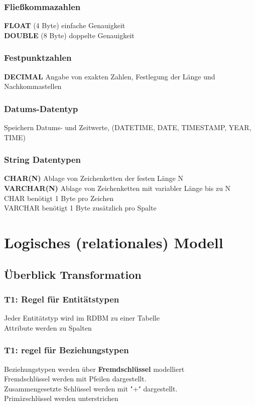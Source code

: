 \documentclass{scrreprt}
\begin{document}
\subsection{Fließkommazahlen}
\textbf{FLOAT} (4 Byte) einfache Genauigkeit
\\\textbf{DOUBLE} (8 Byte) doppelte Genauigkeit
\subsection{Festpunktzahlen}
\textbf{DECIMAL} Angabe von exakten Zahlen, Festlegung der Länge und Nachkommastellen
\subsection{Datums-Datentyp}
Speichern Datums- und Zeitwerte, (DATETIME, DATE, TIMESTAMP, YEAR, TIME)
\subsection{String Datentypen}
\textbf{CHAR(N)} Ablage von Zeichenketten der festen Länge N
\\\textbf{VARCHAR(N)} Ablage von Zeichenketten mit variabler Länge bis zu N
\\CHAR benötigt 1 Byte pro Zeichen 
\\VARCHAR benötigt 1 Byte zusätzlich pro Spalte
\chapter{Logisches (relationales) Modell}
\section{Überblick Transformation}
\subsection{T1: Regel für Entitätstypen}
Jeder Entitätstyp wird im RDBM zu einer Tabelle
\\Attribute werden zu Spalten
\subsection{T1: regel für Beziehungstypen}
Beziehungstypen werden über \textbf{Fremdschlüssel} modelliert
\\Fremdschlüssel werden mit Pfeilen dargestellt.
\\Zusammengesetzte Schlüssel werden mit "+" dargestellt.
\\Primärschlüssel werden unterstrichen
\end{document}
